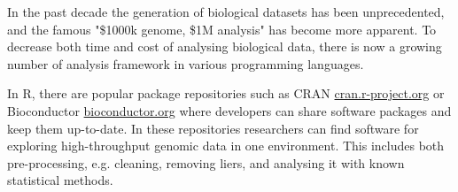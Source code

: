 

%





In the past decade the generation of biological datasets has been unprecedented,
and the famous "\$1000k genome, \$1M analysis"\cite{} has become more apparent.
To decrease both time and cost of analysing biological data, there is now a
growing number of analysis framework in various programming languages.\cite{}

In R, there are popular package repositories such as CRAN
\url{cran.r-project.org} or Bioconductor \url{bioconductor.org} where developers
can share software packages and keep them up-to-date. In these repositories
researchers can find software for exploring high-throughput genomic data in one
environment. This includes both pre-processing, e.g. cleaning, removing
liers, and analysing it with known statistical methods.

